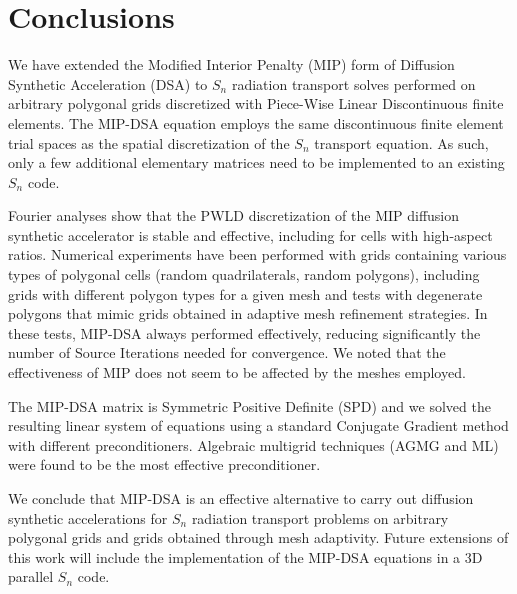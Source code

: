 \documentclass[preprint,10pt]{elsarticle}
\renewcommand{\(}{\left(}
\renewcommand{\)}{\right)}
\renewcommand{\[}{\left[}
\renewcommand{\]}{\right]}
\newcommand{\sn}{\ensuremath{S_n}\xspace}
\begin{document}

\section{Conclusions} \label{sec_conc}

We have extended the Modified Interior Penalty (MIP) form of Diffusion Synthetic Acceleration (DSA) 
to \sn radiation transport solves performed on arbitrary polygonal grids discretized 
with Piece-Wise Linear Discontinuous finite elements. 
The MIP-DSA equation employs the same discontinuous finite element trial spaces as 
the spatial discretization of the \sn transport equation. As such, 
only a few additional elementary matrices need to be implemented to an existing \sn code. 

Fourier analyses show that the PWLD discretization of the MIP diffusion synthetic accelerator 
is stable and effective, including for cells with high-aspect ratios. 
%
Numerical experiments have been performed with grids containing various types of polygonal cells
(random quadrilaterals, random polygons), including
grids with different polygon types for a given mesh and tests with degenerate polygons that mimic
grids obtained in adaptive mesh refinement strategies. In these tests, MIP-DSA always performed effectively,
reducing significantly the number of Source Iterations needed for convergence. 
We noted that the effectiveness of MIP does not seem to be affected by the meshes employed. 
%

The MIP-DSA  matrix is Symmetric Positive Definite (SPD) and we solved the resulting linear system 
of equations using a standard Conjugate Gradient method with different preconditioners. 
Algebraic multigrid techniques (AGMG and ML) were found to be the most
effective preconditioner.

We conclude that MIP-DSA is an effective alternative to
carry out diffusion synthetic accelerations for \sn radiation transport problems on arbitrary polygonal grids and 
grids obtained through mesh adaptivity.
Future extensions of this work will include the implementation of the MIP-DSA equations in a 3D parallel \sn code.







\end{document}
